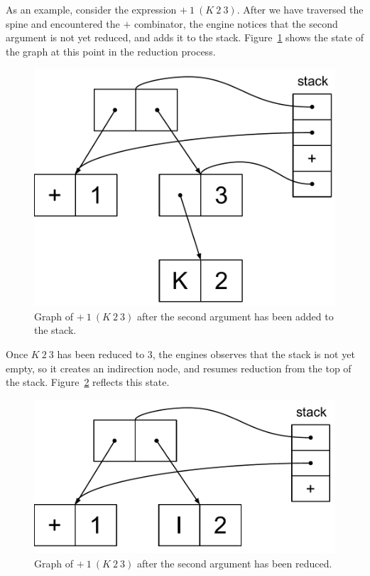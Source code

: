 \documentclass[conference]{IEEEtran}
\begin{document}
As an example, consider the expression $+ \ 1 \ (K \ 2 \ 3)$.
After we have traversed the spine and encountered the $+$ combinator, the engine notices that the second argument is not yet reduced, and adds it to the stack.
Figure~\ref{fig:add_step1} shows the state of the graph at this point in the reduction process.

\begin{figure}
    \includegraphics[width=.8\columnwidth]{add_step1}
    \centering
    \caption{
        Graph of $+ \ 1 \ (K \ 2 \ 3)$ after the second argument has been added to the stack.
    }
    \label{fig:add_step1}
\end{figure}

Once $K \ 2 \ 3$ has been reduced to $3$, the engines observes that the stack is not yet empty, so it creates an indirection node, and resumes reduction from the top of the stack.
Figure~\ref{fig:add_step2} reflects this state.

\begin{figure}
    \includegraphics[width=.8\columnwidth]{add_step2}
    \centering
    \caption{
        Graph of $+ \ 1 \ (K \ 2 \ 3)$ after the second argument has been reduced.
    }
    \label{fig:add_step2}
\end{figure}
\end{document}
